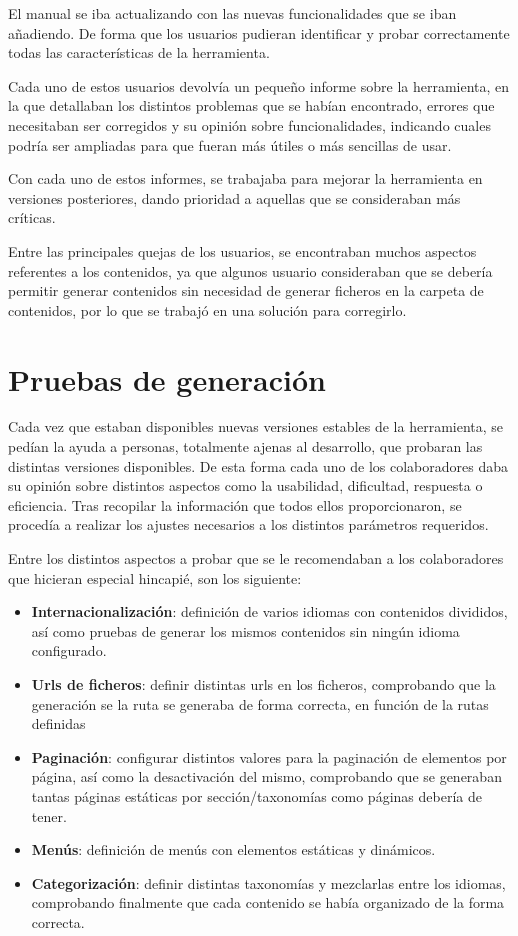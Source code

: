 El manual se iba actualizando con las nuevas funcionalidades que se iban añadiendo. De forma que
los usuarios pudieran identificar y probar correctamente todas las características de la herramienta.

Cada uno de estos usuarios devolvía un pequeño informe sobre la herramienta, en la que detallaban los distintos
problemas que se habían encontrado, errores que necesitaban ser corregidos y su opinión sobre
funcionalidades, indicando cuales podría ser ampliadas para que fueran más útiles o más sencillas de usar.

Con cada uno de estos informes, se trabajaba para mejorar la herramienta en versiones posteriores, dando
prioridad a aquellas que se consideraban más críticas.

Entre las principales quejas de los usuarios, se encontraban muchos aspectos referentes a los contenidos,
ya que algunos usuario consideraban que se debería permitir generar contenidos sin necesidad 
de generar ficheros en la carpeta de contenidos, por lo que se trabajó en una solución para corregirlo.

\section{Pruebas de generación}

Cada vez que estaban disponibles nuevas versiones estables de la herramienta, se pedían la ayuda a personas,
totalmente ajenas al desarrollo, que probaran las distintas versiones disponibles. De esta forma cada uno
de los colaboradores daba su opinión sobre  distintos aspectos como la usabilidad, dificultad, respuesta o eficiencia.
Tras recopilar la información que todos ellos proporcionaron, se procedía a realizar los ajustes
necesarios a los distintos parámetros requeridos.

Entre los distintos aspectos a probar que se le recomendaban a los
colaboradores que hicieran especial hincapié, son los siguiente:

\begin{itemize}
\item \textbf{Internacionalización}: definición de varios idiomas con contenidos divididos, así como pruebas de generar
los mismos contenidos sin ningún idioma configurado.
\item \textbf{Urls de ficheros}: definir distintas urls en los ficheros, comprobando que la generación se la ruta
se generaba de forma correcta, en función de la rutas definidas
\item \textbf{Paginación}: configurar distintos valores para la paginación de elementos por página, así como la desactivación
del mismo, comprobando que se generaban tantas páginas estáticas por sección/taxonomías como páginas debería de tener.
\item \textbf{Menús}: definición de menús con elementos estáticas y dinámicos.
\item \textbf{Categorización}: definir distintas taxonomías y mezclarlas entre los idiomas, comprobando finalmente que cada
contenido se había organizado de la forma correcta.
\end{itemize}
